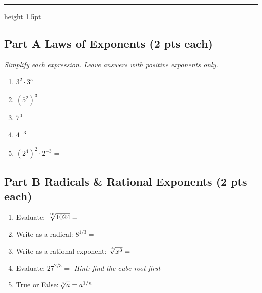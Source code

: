 \documentclass[12pt, letterpaper]{book}
\newcommand{\ansline}{\underline{\hspace{6cm}}}
\newcommand{\shortansline}{\underline{\hspace{3.5cm}}}
\newcommand{\nthroot}[2]{\sqrt[\leftroot{-1}\uproot{2}#1]{#2}}
\begin{document}
\vspace{6pt}
\hrule height 1.5pt
\vspace{10pt}

\subsection*{Part A \quad Laws of Exponents \hfill (2 pts each)}
\textit{Simplify each expression. Leave answers with positive exponents only.}

\begin{enumerate}[label=\textbf{\arabic*.}, leftmargin=*, itemsep=18pt]

\item $3^2 \cdot 3^5 = $ \ansline

\item $(5^2)^3 = $ \ansline

\item $7^0 = $ \ansline

\item $4^{-3} = $ \ansline

\item $(2^4)^2 \cdot 2^{-3} = $ \ansline

\end{enumerate}

\vspace{12pt}
\subsection*{Part B \quad Radicals \& Rational Exponents \hfill (2 pts each)}

\begin{enumerate}[label=\textbf{\arabic*.}, leftmargin=*, itemsep=18pt,
                  start=6]

\item Evaluate: \quad $\nthroot{10}{1024} = $ \ansline

\item Write as a radical: \quad $8^{1/3} = $ \ansline

\item Write as a rational exponent: \quad $\nthroot{4}{x^3} = $ \ansline

\item Evaluate: \quad $27^{2/3} = $ \ansline
      \hfill {\small\itshape Hint: find the cube root first}

\item True or False:\quad $\nthroot{n}{a} = a^{1/n}$ \quad \shortansline

\end{enumerate}
\end{document}
